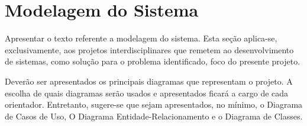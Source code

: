 \section{Modelagem do Sistema}

Apresentar o texto referente a modelagem do sistema. Esta seção aplica-se, exclusivamente, aos projetos interdisciplinares que remetem ao desenvolvimento de sistemas, como solução para o problema identificado, foco do presente projeto.

Deverão ser apresentados os principais diagramas que representam o projeto. A escolha de quais diagramas serão usados e apresentados ficará a cargo de cada orientador. Entretanto, sugere-se que sejam apresentados, no mínimo, o Diagrama de Casos de Uso, O Diagrama Entidade-Relacionamento e o Diagrama de Classes.